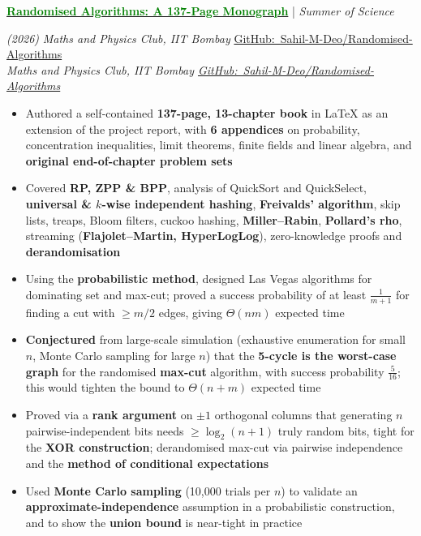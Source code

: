 \documentclass[11pt]{article}
\newcommand{\faGithub}{GitHub:}%
\newcommand{\xfill}[2][1ex]{%
	\dimen0=#2\advance\dimen0 by #1
	\leaders\hrule height \dimen0 depth -#1\hfill
}
\renewcommand{\section}[1]{%
	\par\vspace{9pt}
	{\color{Blue}{\Large\scshape\raggedright #1\xfill[0pt]{0.5pt}}}\par\vspace{3pt}
}
\newcommand{\filldate}[1]{%
	\def\tempdate{#1}%
	\ifx\tempdate\empty\else\strut\hfill{\small\textit{(#1)}}\fi
}
\renewcommand{\subsection}[4]{%
	\def\temp{#4}%
	\par\vspace{5pt}
	{%
		\large
		{\color{Green}\textbf{#1}} | {\sl #2}\filldate{#3}%
		\ifx\temp\empty
		\else
		{\\[0.1em]\fontsize{11}{13.2}\selectfont\sl #4}%
		\fi
	}%
}
\begin{document}
\section{Key Project | Research-Oriented}

\subsection{\href{https://github.com/Sahil-M-Deo/Randomised-Algorithms}{\textcolor{Green}{Randomised Algorithms: A 137-Page Monograph}}}{Summer of Science}{2026}{\textit{Maths and Physics Club, IIT Bombay} \hfill \href{https://github.com/Sahil-M-Deo/Randomised-Algorithms}{\small\faGithub\ Sahil-M-Deo/Randomised-Algorithms}}
\begin{itemize}
    \item Authored a self-contained \textbf{137-page, 13-chapter book} in \LaTeX{} as an extension of the project report, with \textbf{6 appendices} on probability, concentration inequalities, limit theorems, finite fields and linear algebra, and \textbf{original end-of-chapter problem sets}
    \item Covered \textbf{RP, ZPP \& BPP}, analysis of QuickSort and QuickSelect, \textbf{universal \& $k$-wise independent hashing}, \textbf{Freivalds' algorithm}, skip lists, treaps, Bloom filters, cuckoo hashing, \textbf{Miller--Rabin}, \textbf{Pollard's rho}, streaming (\textbf{Flajolet--Martin, HyperLogLog}), zero-knowledge proofs and \textbf{derandomisation}
    \item Using the \textbf{probabilistic method}, designed Las Vegas algorithms for dominating set and max-cut; proved a success probability of at least $\frac{1}{m+1}$ for finding a cut with $\ge m/2$ edges, giving $\Theta(nm)$ expected time
    \item \textbf{Conjectured} from large-scale simulation (exhaustive enumeration for small $n$, Monte Carlo sampling for large $n$) that the \textbf{5-cycle is the worst-case graph} for the randomised \textbf{max-cut} algorithm, with success probability $\frac{5}{16}$; this would tighten the bound to $\Theta(n+m)$ expected time
    \item Proved via a \textbf{rank argument} on $\pm1$ orthogonal columns that generating $n$ pairwise-independent bits needs $\ge \log_2(n+1)$ truly random bits, tight for the \textbf{XOR construction}; derandomised max-cut via pairwise independence and the \textbf{method of conditional expectations}
    \item Used \textbf{Monte Carlo sampling} (10,000 trials per $n$) to validate an \textbf{approximate-independence} assumption in a probabilistic construction, and to show the \textbf{union bound} is near-tight in practice
\end{itemize}
\end{document}
